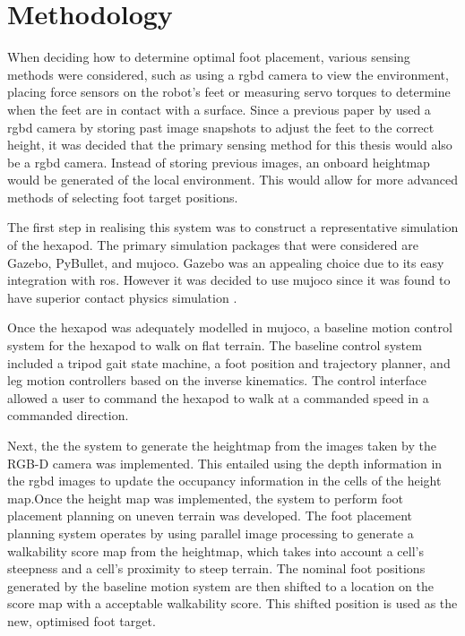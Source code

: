 \section{Methodology}
    When deciding how to determine optimal foot placement, various sensing methods were considered, such as using a \ac{rgbd} camera to view the environment, placing force sensors on the robot's feet or measuring servo torques to determine when the feet are in contact with a surface. Since a previous paper by \cite{erasmus2023guidance} used a \ac{rgbd} camera by storing past image snapshots to adjust the feet to the correct height, it was decided that the primary sensing method for this thesis would also be a \ac{rgbd} camera. Instead of storing previous images, an onboard heightmap would be generated of the local environment. This would allow for more advanced methods of selecting foot target positions.

    The first step in realising this system was to construct a representative simulation of the hexapod. The primary simulation packages that were considered are Gazebo, PyBullet, and \ac{mujoco}. Gazebo was an appealing choice due to its easy integration with \acf{ros}. However it was decided to use \ac{mujoco} since it was found to have superior contact physics simulation \citep{Erez-2015}.

    Once the hexapod was adequately modelled in \ac{mujoco}, a baseline motion control system for the hexapod to walk on flat terrain. The baseline control system included a tripod gait state machine,
    a foot position and trajectory planner, and leg motion controllers based on the inverse kinematics. The control interface allowed a user to command the hexapod to walk at a commanded speed in a commanded direction.

    Next, the the system to generate the heightmap from the images taken by the RGB-D camera was implemented. This entailed using the depth information in the \ac{rgbd} images to update the occupancy information in the cells of the height map.Once the height map was implemented, the system to perform foot placement planning on uneven terrain was developed.     The foot placement planning system operates by using parallel image processing to generate a walkability score map from the heightmap, which takes into account a cell's steepness and a cell's proximity to steep terrain. The nominal foot positions generated by the baseline motion system are then shifted to a location on the score map with a acceptable walkability score. This shifted position is used as the new, optimised foot target.

